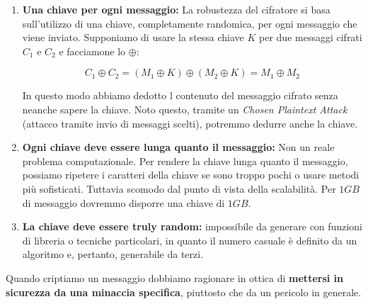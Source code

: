\begin{enumerate}
    \item \textbf{Una chiave per ogni messaggio:} La robustezza del cifratore si basa sull'utilizzo di una chiave, completamente randomica, per ogni messaggio che viene inviato. Supponiamo di usare la stessa chiave $K$ per due messaggi cifrati $C_1$ e $C_2$ e facciamone lo $\oplus$:
    \begin{center}
    \vspace{-25pt}
        \begin{equation*}
            C_1\oplus{C_2}=(M_1\oplus{K})\oplus(M_2\oplus{K})=M_1\oplus{M_2}
        \end{equation*}
    \end{center}
    In questo modo abbiamo dedotto l contenuto del messaggio cifrato senza neanche sapere la chiave. Noto questo, tramite un \emph{Chosen Plaintext Attack} (attacco tramite invio di messaggi scelti), potremmo dedurre anche la chiave. 
    \item \textbf{Ogni chiave deve essere lunga quanto il messaggio:} Non un reale problema computazionale. Per rendere la chiave lunga quanto il messaggio, possiamo ripetere i caratteri della chiave se sono troppo pochi o usare metodi più sofisticati. Tuttavia scomodo dal punto di vista della scalabilità. Per $1GB$ di messaggio dovremmo disporre una chiave di $1GB$.
    \item \textbf{La chiave deve essere truly random:} impossibile da generare con funzioni di libreria o tecniche particolari, in quanto il numero casuale è definito da un algoritmo e, pertanto, generabile da terzi.
\end{enumerate}
\begin{corollary}
Quando criptiamo un messaggio dobbiamo ragionare in ottica di \textbf{mettersi in sicurezza da una minaccia specifica}, piuttosto che da un pericolo in generale.
\end{corollary}
